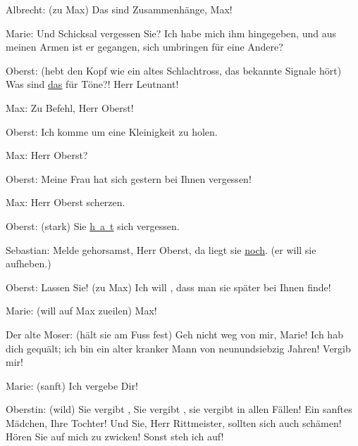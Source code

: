 \pstart
           Albrecht: (zu Max) Das sind  Zusammenhänge, Max!\pend
           
\pstart
           Marie: Und  Schicksal vergessen Sie? Ich habe mich ihm
               hingegeben, und aus meinen Armen ist er gegangen, sich umbringen für eine Andere?
                  \label{K_L01900-2v}\label{K_L01900-2}\pend
           
\pstart
           Oberst: (hebt den Kopf wie ein altes Schlachtross, das bekannte Signale hört) Was
               sind \uline{das} für Töne?! Herr Leutnant!\pend
           
\pstart
           Max: Zu Befehl, Herr Oberst!\pend
           
\pstart
           Oberst: Ich komme um eine Kleinigkeit zu holen.\pend
           
\pstart
           Max: Herr Oberst?\pend
           
\pstart
           {\pb}Oberst: Meine Frau hat sich
               gestern bei Ihnen vergessen!\pend
           
\pstart
           Max: Herr Oberst scherzen.\pend
           
\pstart
           Oberst: (stark) Sie 
               \uline{h a t}
                sich vergessen.\pend
           
\pstart
           Sebastian: Melde gehorsamst, Herr Oberst, da liegt sie \uline{noch}. (er will sie aufheben.)\pend
           
\pstart
           Oberst: Lassen Sie! (zu Max) Ich will , dass man
               sie später bei Ihnen finde!\pend
           
\pstart
           Marie: (will auf Max zueilen) Max!\pend
           
\pstart
           Der alte Moser: (hält sie am Fuss fest) Geh nicht weg von mir, Marie! Ich hab dich
               gequält; ich bin ein alter kranker Mann von neunundsiebzig Jahren! Vergib mir!\pend
           
\pstart
           Marie: (sanft) Ich vergebe Dir!\pend
           
\pstart
           Oberstin: (wild) Sie vergibt , Sie vergibt , sie vergibt in allen Fällen! Ein sanftes Mädchen, Ihre
               Tochter! Und Sie, Herr Rittmeister, sollten sich auch schämen! Hören Sie auf mich zu
               zwicken! Sonst steh ich auf!\pend
           
